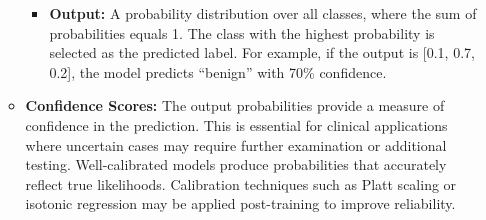 \begin{itemize}
\begin{itemize}
\begin{itemize}
                    \item \textbf{Output:} A probability distribution over all classes, where the 
                    sum of probabilities equals 1. The class with the highest probability is 
                    selected as the predicted label. For example, if the output is [0.1, 0.7, 0.2], 
                    the model predicts “benign” with 70\% confidence.
                \end{itemize}
            
            \item \textbf{Confidence Scores:} The output probabilities provide a measure of 
            confidence in the prediction. This is essential for clinical applications where 
            uncertain cases may require further examination or additional testing. Well-calibrated 
            models produce probabilities that accurately reflect true likelihoods. Calibration 
            techniques such as Platt scaling or isotonic regression may be applied post-training to 
            improve reliability.
        \end{itemize}
\end{itemize}
